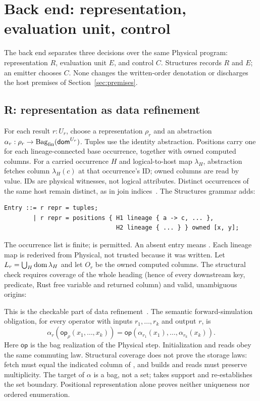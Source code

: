 \section{Back end: representation, evaluation unit, control}
\label{sec:backend}

The back end separates three decisions over the same Physical program:
representation $R$, evaluation unit $E$, and control $C$. Structures records
$R$ and $E$; an emitter chooses $C$. None changes the written-order denotation
or discharges the host premises of Section~\ref{sec:premises}.

\subsection{R: representation as data refinement}
For each result $r:U_r$, choose a representation $\rho_r$ and an abstraction
$\alpha_r:\rho_r\to\operatorname{Bag}_{\rm fin}(\mathsf{dom}^{U_r})$.
Tuples use the identity abstraction. Positions carry one  for each
lineage-connected base occurrence, together with owned computed columns.
For a carried occurrence $H$ and logical-to-host map $\lambda_H$, abstraction
fetches column $\lambda_H(c)$ at that occurrence's ID; owned columns are read
by value. IDs are physical witnesses, not logical attributes. Distinct
occurrences of the same host remain distinct, as in join indices~\cite{paper-join-indices}.
The Structures grammar adds:
\begin{lstlisting}
Entry ::= r repr = tuples;
        | r repr = positions { H1 lineage { a -> c, ... },
                               H2 lineage { ... } } owned [x, y];
\end{lstlisting}
The occurrence list is finite;  is permitted. An absent entry
means . Each lineage map is rederived from Physical, not trusted
because it was written. Let $L_r=\bigcup_H\operatorname{dom}\lambda_H$ and let $O_r$ be the
owned computed columns. The structural check requires coverage of the whole
heading (hence of every downstream key, predicate, Rust free variable and
returned column) and valid, unambiguous origins:
\begin{mathpar}
\end{mathpar}
This is the checkable part of data refinement~\cite{paper-data-refinement}.
The semantic forward-simulation obligation, for every operator with inputs
$r_1,\ldots,r_k$ and output $r$, is
\[
 \alpha_r(\mathsf{op}_{\rho}(x_1,\ldots,x_k))
 =\mathsf{op}(\alpha_{r_1}(x_1),\ldots,\alpha_{r_k}(x_k)).
\]
Here $\mathsf{op}$ is the bag realization of the Physical step.
Initialization and reads obey the same commuting law.
Structural coverage does not prove the storage laws: fetch
must equal the indicated column of , and builds and reads must
preserve multiplicity. The target of $\alpha$ is a bag, not a set;
 takes support and re-establishes the set boundary. Positional
representation alone proves neither uniqueness nor ordered enumeration.

